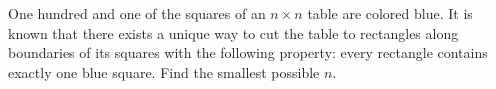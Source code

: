 One hundred and one of the squares of an $n\times n$ table are colored blue. It is known that there exists a unique way to cut the table to rectangles along boundaries of its squares with the following property: every rectangle contains exactly one blue square. Find the smallest possible $n$.
